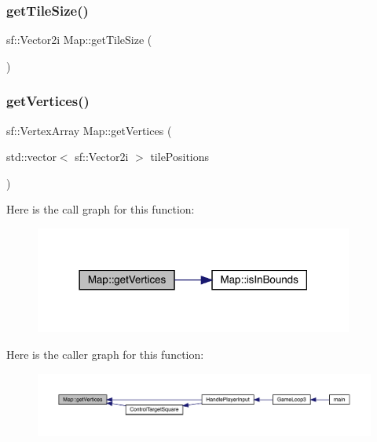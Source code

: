\subsubsection{\texorpdfstring{get\+Tile\+Size()}{getTileSize()}}
{\footnotesize\ttfamily sf\+::\+Vector2i Map\+::get\+Tile\+Size (\begin{DoxyParamCaption}{ }\end{DoxyParamCaption})}

\mbox{\label{class_map_ace55cfcebed9b27fd2329a16ce4ab352}} 
\subsubsection{\texorpdfstring{get\+Vertices()}{getVertices()}}
{\footnotesize\ttfamily sf\+::\+Vertex\+Array Map\+::get\+Vertices (\begin{DoxyParamCaption}\item[{std\+::vector$<$ sf\+::\+Vector2i $>$}]{tile\+Positions }\end{DoxyParamCaption})}

Here is the call graph for this function\+:
\nopagebreak
\begin{figure}[H]
\begin{center}
\leavevmode
\includegraphics[width=297pt]{class_map_ace55cfcebed9b27fd2329a16ce4ab352_cgraph}
\end{center}
\end{figure}
Here is the caller graph for this function\+:
\nopagebreak
\begin{figure}[H]
\begin{center}
\leavevmode
\includegraphics[width=350pt]{class_map_ace55cfcebed9b27fd2329a16ce4ab352_icgraph}
\end{center}
\end{figure}
\mbox{\label{class_map_a1e9263abe2e1290fc383586c327f9f4a}} 
